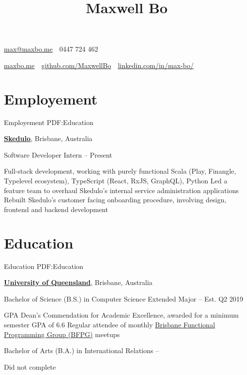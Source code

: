 \documentclass[a4paper,10pt,oneside]{article}
\begin{document}

\title{Maxwell Bo}

\begin{subtitle}
\par \href{mailto:max@maxbo.me}{max@maxbo.me} \,\BulletSymbol\, 0447 724 462

\par \href{http://maxbo.me/}{maxbo.me} 
\,\BulletSymbol\, 
\href{https://github.com/MaxwellBo}{github.com/MaxwellBo}
\,\BulletSymbol\, 
\href{https://www.linkedin.com/in/max-bo/}{linkedin.com/in/max-bo/}

\end{subtitle}

\begin{body}


\section
{Employement}
{Employement}
{PDF:Education}

\href{https://skedulo.com/}{\textbf{Skedulo}}, Brisbane, Australia
\par Software Developer Intern\hfill {} -- Present 
\begin{detail}
	\BulletItem Full-stack development, working with purely functional Scala (Play, Finangle, Typelevel ecosystem),\newline
	TypeScript (React, RxJS, GraphQL), Python
	\BulletItem Led a feature team to overhaul Skedulo's internal service administration applications
	\BulletItem Rebuilt Skedulo's customer facing onboarding procedure, involving design, frontend and backend development
\end{detail}


\section
{Education}
{Education}
{PDF:Education}

\href{https://www.uq.edu.au/}{\textbf{University of Queensland}}, Brisbane, Australia
\par Bachelor of Science (B.S.) in Computer Science Extended Major\hfill {} -- Est. Q2 2019
\begin{detail}
 GPA
\BulletItem Dean's Commendation for Academic Excellence, awarded for a minimum semester GPA of 6.6
\BulletItem Regular attendee of monthly \href{https://www.meetup.com/en-AU/Brisbane-Functional-Programming-Group/}{Brisbane Functional Programming Group (BFPG)} meetups
\end{detail}
\par Bachelor of Arts (B.A.) in International Relations\hfill {} -- 
\begin{detail}
Did not complete
\end{detail}


\end{body}
\end{document}
